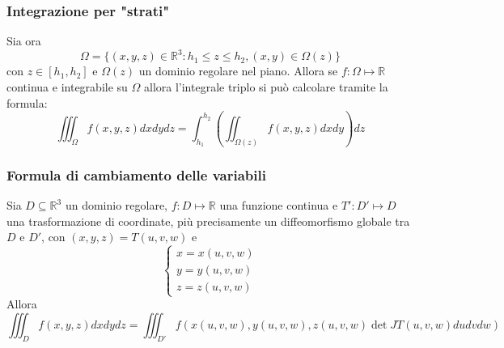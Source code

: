 \documentclass[a4paper]{article}
\numberwithin{equation}{subsection}
\begin{document}
\subsubsection{Integrazione per "strati"}

Sia ora
\[\Omega = \{(x,y,z) \in \mathbb{R}^3 : h_1 \le z \le h_2, (x,y) \in \Omega(z)\}\]
con $z \in [h_1, h_2]$ e $\Omega(z)$ un dominio regolare nel piano. 
Allora se $f : \Omega \mapsto \mathbb{R}$ continua e integrabile su $\Omega$ 
allora l'integrale triplo si può calcolare tramite la formula:
\[\iiint_\Omega f(x,y,z)dxdydz = \int_{h_1}^{h_2} \left(\iint_{\Omega(z)} f(x,y,z) dxdy\right)dz\]

\subsubsection{Formula di cambiamento delle variabili}

\thm{}
{
    Sia $D \subseteq \mathbb{R}^3$ un dominio regolare, $f : D \mapsto \mathbb{R}$ una funzione continua e 
    $T' : D' \mapsto D$ una trasformazione di coordinate, più precisamente un diffeomorfismo globale tra $D$ e $D'$,
    con $(x,y,z) = T(u,v,w)$ e 
    \[\begin{cases}
        x = x(u,v,w)\\
        y = y(u,v,w)\\
        z = z(u,v,w)
    \end{cases}\] 
    Allora
    \[\iiint_D f(x,y,z)dxdydz = \iiint_{D'}f(x(u,v,w), y(u,v,w), z(u,v,w)\det{JT(u,v,w)} dudvdw)\]
}
\end{document}
